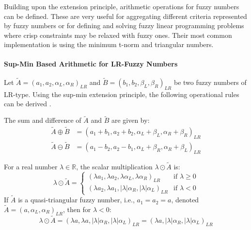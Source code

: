 Building upon the extension principle, arithmetic operations for fuzzy numbers can be defined. These are very useful for aggregating different criteria represented by fuzzy numbers or for defining and solving fuzzy linear programming problems where crisp constraints may be relaxed with fuzzy ones. Their most common implementation is using the minimum t-norm and triangular numbers.

\paragraph{Sup-Min Based Arithmetic for LR-Fuzzy Numbers}
Let $\tilde{A} = (a_1, a_2, \alpha_L, \alpha_R)_{LR}$ and $\tilde{B} = (b_1, b_2, \beta_L, \beta_R)_{LR}$ be two fuzzy numbers of LR-type. Using the sup-min extension principle, the following operational rules can be derived \cite[p.16]{FULLER2}.

\begin{proposition}
\label{prop:lr_add_sub}
The sum and difference of $\tilde{A}$ and $\tilde{B}$ are given by:
\begin{align}
\tilde{A} \oplus \tilde{B} &= (a_1+b_1, a_2+b_2, \alpha_L+\beta_L, \alpha_R+\beta_R)_{LR} \\
\tilde{A} \ominus \tilde{B} &= (a_1-b_2, a_2-b_1, \alpha_L+\beta_R, \alpha_R+\beta_L)_{LR}
\end{align}
\end{proposition}

\begin{proposition}
\label{prop:lr_scalar_mult}
For a real number $\lambda \in \mathbb{R}$, the scalar multiplication $\lambda \odot \tilde{A}$ is:
\begin{equation}
\lambda \odot \tilde{A} =
\begin{cases}
(\lambda a_1, \lambda a_2, \lambda\alpha_L, \lambda\alpha_R)_{LR} & \text{if } \lambda \ge 0 \\
(\lambda a_2, \lambda a_1, |\lambda|\alpha_R, |\lambda|\alpha_L)_{LR} & \text{if } \lambda < 0
\end{cases}
\end{equation}
If $\tilde{A}$ is a quasi-triangular fuzzy number, i.e., $a_1=a_2=a$, denoted $\tilde{A}=(a, \alpha_L, \alpha_R)_{LR}$, then for $\lambda < 0$:
\begin{equation}
\lambda \odot \tilde{A} = (\lambda a, \lambda a, |\lambda|\alpha_R, |\lambda|\alpha_L)_{LR} = (\lambda a, |\lambda|\alpha_R, |\lambda|\alpha_L)_{LR}
\end{equation}
\end{proposition}

